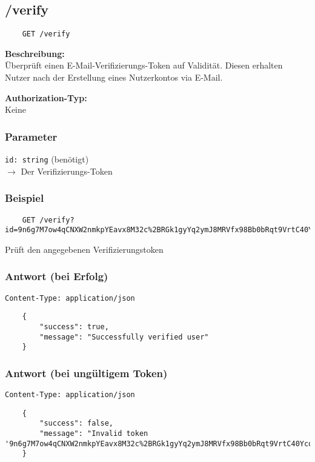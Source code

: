 \subsection{/verify}
\label{verify}

\begin{lstlisting}
    GET /verify
\end{lstlisting}

\textbf{Beschreibung:} \\
Überprüft einen E-Mail-Verifizierungs-Token auf Validität. Diesen erhalten Nutzer nach der Erstellung eines Nutzerkontos via E-Mail.

\textbf{Authorization-Typ:} \\
Keine

\subsubsection{Parameter}

\lstinline{id: string} (benötigt) \\
$\rightarrow$ Der Verifizierungs-Token

\subsubsection{Beispiel}

\begin{lstlisting}
    GET /verify?id=9n6g7M7ow4qCNXW2nmkpYEavx8M32c%2BRGk1gyYq2ymJ8MRVfx98Bb0bRqt9VrtC40YcqKWpRk86FAShSH4zhQ%3D%3D
\end{lstlisting}

Prüft den angegebenen Verifizierungstoken

\subsubsection{Antwort (bei Erfolg)}

\lstinline{Content-Type: application/json}
\begin{lstlisting}
    {
        "success": true, 
        "message": "Successfully verified user"
    }
\end{lstlisting}

\subsubsection{Antwort (bei ungültigem Token)}

\lstinline{Content-Type: application/json}
\begin{lstlisting}
    {
        "success": false, 
        "message": "Invalid token '9n6g7M7ow4qCNXW2nmkpYEavx8M32c%2BRGk1gyYq2ymJ8MRVfx98Bb0bRqt9VrtC40YcqKWpRk86FAShSH4zhQ%3D%3D'" 
    }
\end{lstlisting}